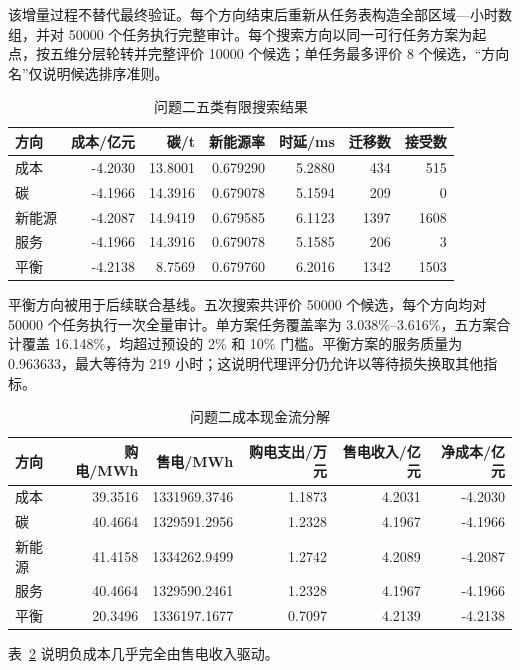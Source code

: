 该增量过程不替代最终验证。每个方向结束后重新从任务表构造全部区域—小时数组，并对 50000 个任务执行完整审计。每个搜索方向以同一可行任务方案为起点，按五维分层轮转并完整评价 10000 个候选；单任务最多评价 8 个候选，“方向名”仅说明候选排序准则。

\begin{table}[H]\centering
{\small
\caption{问题二五类有限搜索结果}\label{tab:q2schemes}
\begin{tabular}{lrrrrrr}\toprule
方向 & 成本/亿元 & 碳/t & 新能源率 & 时延/ms & 迁移数 & 接受数\\\midrule
成本 & -4.2030 & 13.8001 & 0.679290 & 5.2880 & 434 & 515\\
碳 & -4.1966 & 14.3916 & 0.679078 & 5.1594 & 209 & 0\\
新能源 & -4.2087 & 14.9419 & 0.679585 & 6.1123 & 1397 & 1608\\
服务 & -4.1966 & 14.3916 & 0.679078 & 5.1585 & 206 & 3\\
平衡 & -4.2138 & 8.7569 & 0.679760 & 6.2016 & 1342 & 1503\\\bottomrule
\end{tabular}
}
\end{table}

平衡方向被用于后续联合基线。五次搜索共评价 50000 个候选，每个方向均对 50000 个任务执行一次全量审计。单方案任务覆盖率为 3.038\%--3.616\%，五方案合计覆盖 16.148\%，均超过预设的 2\% 和 10\% 门槛。平衡方案的服务质量为 0.963633，最大等待为 219 小时；这说明代理评分仍允许以等待损失换取其他指标。

\begin{table}[H]\centering
{\small
\caption{问题二成本现金流分解}\label{tab:q2cost}
\begin{tabular}{lrrrrr}\toprule
方向 & 购电/MWh & 售电/MWh & 购电支出/万元 & 售电收入/亿元 & 净成本/亿元\\\midrule
成本 & 39.3516 & 1331969.3746 & 1.1873 & 4.2031 & -4.2030\\
碳 & 40.4664 & 1329591.2956 & 1.2328 & 4.1967 & -4.1966\\
新能源 & 41.4158 & 1334262.9499 & 1.2742 & 4.2089 & -4.2087\\
服务 & 40.4664 & 1329590.2461 & 1.2328 & 4.1967 & -4.1966\\
平衡 & 20.3496 & 1336197.1677 & 0.7097 & 4.2139 & -4.2138\\\bottomrule
\end{tabular}
}
\end{table}

表~\ref{tab:q2cost} 说明负成本几乎完全由售电收入驱动。


